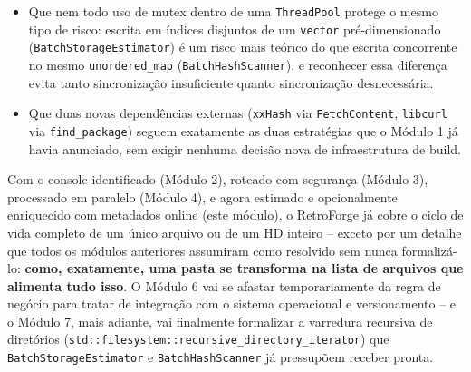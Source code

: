 \begin{CaixaResumo}
\begin{itemize}
    \item Que nem todo uso de mutex dentro de uma \texttt{ThreadPool} protege o mesmo tipo de risco: escrita em índices disjuntos de um \texttt{vector} pré-dimensionado (\texttt{BatchStorageEstimator}) é um risco mais teórico do que escrita concorrente no mesmo \texttt{unordered\_map} (\texttt{BatchHashScanner}), e reconhecer essa diferença evita tanto sincronização insuficiente quanto sincronização desnecessária.
    \item Que duas novas dependências externas (\texttt{xxHash} via \texttt{FetchContent}, \texttt{libcurl} via \texttt{find\_package}) seguem exatamente as duas estratégias que o Módulo 1 já havia anunciado, sem exigir nenhuma decisão nova de infraestrutura de build.
\end{itemize}

Com o console identificado (Módulo 2), roteado com segurança (Módulo 3), processado em paralelo (Módulo 4), e agora estimado e opcionalmente enriquecido com metadados online (este módulo), o RetroForge já cobre o ciclo de vida completo de um único arquivo ou de um HD inteiro -- exceto por um detalhe que todos os módulos anteriores assumiram como resolvido sem nunca formalizá-lo: \textbf{como, exatamente, uma pasta se transforma na lista de arquivos que alimenta tudo isso}. O Módulo 6 vai se afastar temporariamente da regra de negócio para tratar de integração com o sistema operacional e versionamento -- e o Módulo 7, mais adiante, vai finalmente formalizar a varredura recursiva de diretórios (\texttt{std::filesystem::recursive\_directory\_iterator}) que \texttt{BatchStorageEstimator} e \texttt{BatchHashScanner} já pressupõem receber pronta.
\end{CaixaResumo}
